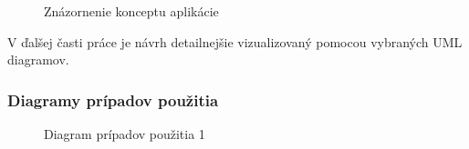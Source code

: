 \begin{figure}[hbt!]
  \centering  
  \def\stackalignment{c}
           {\scriptsize}
	\caption{Znázornenie konceptu aplikácie}  
  \label{app-diagram}
\end{figure}

V ďalšej časti práce je návrh detailnejšie vizualizovaný pomocou vybraných UML diagramov. 

\pagebreak

\subsubsection{Diagramy prípadov použitia}
\begin{figure}[hbt!]
  \centering  
  \def\stackalignment{c}
           {\scriptsize}
	\caption{Diagram prípadov použitia 1}  
  \label{usecase1}
\end{figure}

